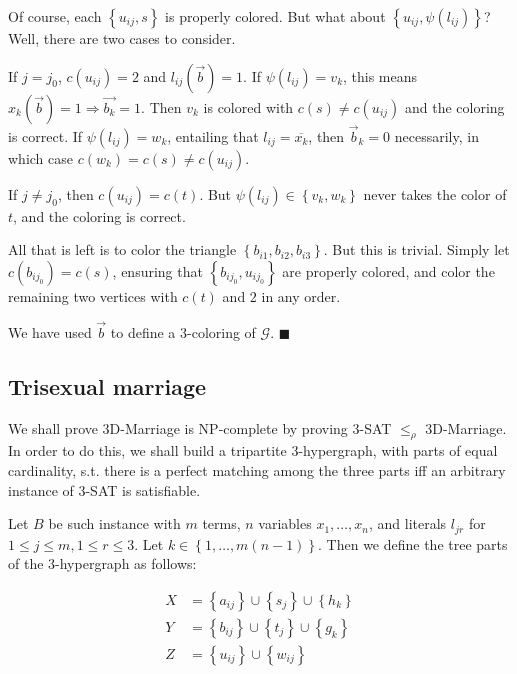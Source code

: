 \documentclass[a4paper]{article}
\begin{document}
Of course, each $\left\{ u_{ij}, s \right\} $ is properly colored. But what about 
$\left\{ u_{ij}, \psi(l_{ij}) \right\} $? Well, there are two cases to consider. 

If $j = j_0$, $c(u_{ij}) = 2$ and $l_{ij}(\overrightarrow{b}) = 1$. If
$\psi(l_{ij}) = v_k$, this means $x_{k}(\overrightarrow{b}) = 1 \Rightarrow
\overrightarrow{b_k} = 1$. Then $v_k$ is colored with $c(s) \neq c(u_{ij})$ and the coloring 
is correct. If $\psi(l_{ij}) = w_k$, entailing that $l_{ij} = \overline{x_k}$, then 
$\overrightarrow{b}_k = 0$ necessarily, in which case $c(w_k) = c(s) \neq c(u_{ij})$.

If $j \neq j_0$, then $c(u_{ij}) = c(t)$. But $\psi(l_{ij}) \in \left\{ v_k, w_k \right\} $ never
takes the color of $t$, and the coloring is correct.

All that is left is to color the triangle $\left\{ b_{i1}, b_{i2}, b_{i 3} \right\} $.
But this is trivial. Simply let $c(b_{i j_0}) = c(s)$, ensuring 
that $\left\{ b_{i j_0}, u_{i j_0} \right\} $ are properly colored,
and color the remaining two vertices with $c(t)$ and $2$ in 
any order.

We have used $\overrightarrow{b}$ to define a 3-coloring of $\mathcal{G}$. $\blacksquare$

\pagebreak
\subsection{Trisexual marriage}

We shall prove 3D-Marriage is NP-complete by proving 3-SAT $\leq_{\rho}$ 3D-Marriage. 
In order to do this, we shall build a tripartite $3$-hypergraph, with parts 
of equal cardinality, s.t. there is a perfect matching among the three parts 
iff an arbitrary instance of 3-SAT is satisfiable.

Let $B$ be such instance with $m$ terms, $n$ variables $x_1, \ldots, x_n$, and
literals $l_{jr}$ for $1 \leq j \leq m, 1 \leq r \leq 3$. Let $k \in \left\{ 1,
\ldots, m(n-1) \right\} $. Then we define the tree parts of the 3-hypergraph as follows: 

\begin{align*}
    X &= \left\{ a_{ij} \right\} \cup \left\{ s_j \right\} \cup \left\{ h_k \right\}  \\ 
    Y&=  \left\{ b_{ij} \right\} \cup \left\{ t_j \right\} \cup \left\{ g_k \right\} \\ 
    Z &= \left\{ u_{ij} \right\} \cup \left\{ w_{ij} \right\} 
\end{align*}
\end{document}
